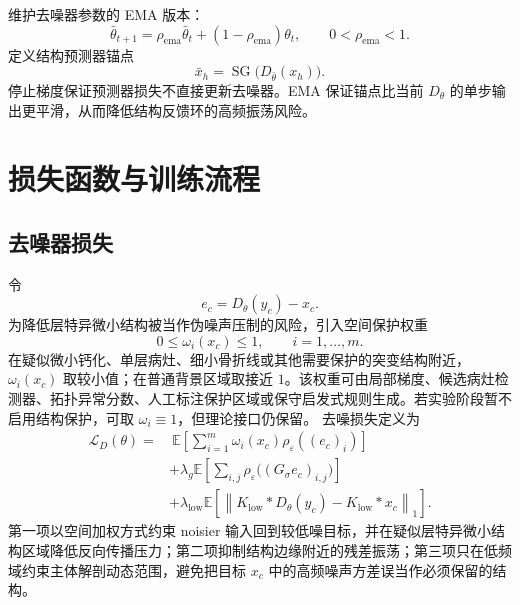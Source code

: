 \documentclass[11pt,a4paper,UTF8,fontset=fandol]{ctexart}
\theoremstyle{definition}
\DeclareMathOperator{\SG}{SG}
\newcommand{\norm}[1]{\left\lVert#1\right\rVert}
\newcommand{\E}{\mathbb{E}}
\newcommand{\cL}{\mathcal{L}}
\begin{document}
维护去噪器参数的 EMA 版本：
\begin{equation}
\label{eq:ema-theta}
    \bar\theta_{t+1}=\rho_{\mathrm{ema}}\bar\theta_t+
    (1-\rho_{\mathrm{ema}})\theta_t,
    \qquad
    0<\rho_{\mathrm{ema}}<1.
\end{equation}
定义结构预测器锚点
\begin{equation}
\label{eq:ema-anchor}
    \bar x_h=\SG\big(D_{\bar\theta}(x_h)\big).
\end{equation}
停止梯度保证预测器损失不直接更新去噪器。EMA 保证锚点比当前 $D_\theta$ 的单步输出更平滑，从而降低结构反馈环的高频振荡风险。

\section{损失函数与训练流程}

\subsection{去噪器损失}

令
\begin{equation}
\label{eq:denoise-residual}
    e_c=D_\theta(y_c)-x_c.
\end{equation}
为降低层特异微小结构被当作伪噪声压制的风险，引入空间保护权重
\begin{equation}
\label{eq:protection-weight}
    0\le\omega_i(x_c)\le1,
    \qquad
    i=1,\ldots,m.
\end{equation}
在疑似微小钙化、单层病灶、细小骨折线或其他需要保护的突变结构附近，$\omega_i(x_c)$ 取较小值；在普通背景区域取接近 $1$。该权重可由局部梯度、候选病灶检测器、拓扑异常分数、人工标注保护区域或保守启发式规则生成。若实验阶段暂不启用结构保护，可取 $\omega_i\equiv1$，但理论接口仍保留。
去噪损失定义为
\begin{equation}
\label{eq:LD-def}
\begin{aligned}
\cL_D(\theta)
=&\ \E\left[\sum_{i=1}^m\omega_i(x_c)\rho_\varepsilon((e_c)_i)\right]\\
&+\lambda_g\E\left[\sum_{i,j}\rho_\varepsilon\big((G_\sigma e_c)_{i,j}\big)\right]\\
&+\lambda_{\mathrm{low}}\E\left[
    \norm{K_{\mathrm{low}}*D_\theta(y_c)-K_{\mathrm{low}}*x_c}_1
\right].
\end{aligned}
\end{equation}
第一项以空间加权方式约束 noisier 输入回到较低噪目标，并在疑似层特异微小结构区域降低反向传播压力；第二项抑制结构边缘附近的残差振荡；第三项只在低频域约束主体解剖动态范围，避免把目标 $x_c$ 中的高频噪声方差误当作必须保留的结构。
\end{document}
